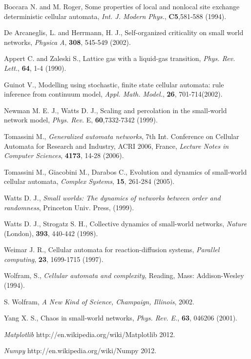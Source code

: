 \documentclass[11pt,twocolumn]{article}
\begin{document}
\begin{thebibliography}{A}

 Boccara N. and M. Roger,
    Some properties of local and nonlocal site exchange deterministic
    cellular automata, {\it Int. J. Modern Phys.}, {\bf C5},581-588 (1994).

 De Arcaneglis, L. and Herrmann, H. J.,
Self-organized criticality on small world networks, {\it Physica
A}, {\bf 308}, 545-549 (2002).

 Appert C. and Zaleski S., Lattice gas with a
liquid-gas transition, {\it Phys. Rev. Lett.}, {\bf 64}, 1-4
(1990).

 Guinot V., Modelling using stochastic, finite state
cellular automata: rule inference from continuum model, {\it Appl.
Math. Model.}, {\bf 26}, 701-714(2002).

 Newman M. E. J., Watts D. J., Scaling and percolation
in the small-world network model, {\it Phys. Rev.} E, {\bf
60},7332-7342 (1999).

 Tomassini M., {\it Generalized automata networks},
7th Int. Conference on Cellular Automata for Research and Industry,
ACRI 2006, France, {\it Lecture Notes in Computer Sciences}, {\bf
4173}, 14-28 (2006).

 Tomassini M., Giacobini M., Darabos C.,
Evolution and dynamics of small-world cellular automata, {\it
Complex Systems}, {\bf 15}, 261-284 (2005).

 Watts D. J., {\it Small worlds: The dynamics of networks
between order and randomness}, Princeton Univ. Press, (1999).

 Watts D. J., Strogatz S. H., Collective dynamics of small-world
networks, {\it Nature} (London), {\bf 393}, 440-442 (1998).

 Weimar J. R., Cellular automata for reaction-diffusion systems,
{\it Parallel computing}, {\bf 23}, 1699-1715 (1997).

 Wolfram, S., {\it Cellular automata and complexity},
Reading, Mass: Addison-Wesley (1994).

 S. Wolfram, {\it A New Kind of Science, Champaign, Illinois}, 2002.

 Yang X. S., Chaos in small-world networks, {\it
Phys. Rev. E.}, {\bf 63}, 046206 (2001).

 {\it Matplotlib} http://en.wikipedia.org/wiki/Matplotlib 2012.  

 {\it Numpy} http://en.wikipedia.org/wiki/Numpy 2012.

\end{thebibliography}
\end{document}
